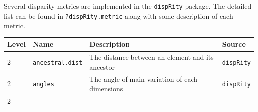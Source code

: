 \documentclass[]{book}
\begin{document}
Several disparity metrics are implemented in the \texttt{dispRity} package.
The detailed list can be found in \texttt{?dispRity.metric} along with some description of each metric.

\begin{longtable}[]{@{}llll@{}}
\toprule
\begin{minipage}[b]{0.07\columnwidth}\raggedright
Level\strut
\end{minipage} & \begin{minipage}[b]{0.07\columnwidth}\raggedright
Name\strut
\end{minipage} & \begin{minipage}[b]{0.64\columnwidth}\raggedright
Description\strut
\end{minipage} & \begin{minipage}[b]{0.10\columnwidth}\raggedright
Source\strut
\end{minipage}\tabularnewline
\midrule
\endhead
\begin{minipage}[t]{0.07\columnwidth}\raggedright
2\strut
\end{minipage} & \begin{minipage}[t]{0.07\columnwidth}\raggedright
\texttt{ancestral.dist}\strut
\end{minipage} & \begin{minipage}[t]{0.64\columnwidth}\raggedright
The distance between an element and its ancestor\strut
\end{minipage} & \begin{minipage}[t]{0.10\columnwidth}\raggedright
\texttt{dispRity}\strut
\end{minipage}\tabularnewline
\begin{minipage}[t]{0.07\columnwidth}\raggedright
2\strut
\end{minipage} & \begin{minipage}[t]{0.07\columnwidth}\raggedright
\texttt{angles}\strut
\end{minipage} & \begin{minipage}[t]{0.64\columnwidth}\raggedright
The angle of main variation of each dimensions\strut
\end{minipage} & \begin{minipage}[t]{0.10\columnwidth}\raggedright
\texttt{dispRity}\strut
\end{minipage}\tabularnewline
\begin{minipage}[t]{0.07\columnwidth}\raggedright
2\strut
\end{minipage} & \begin{minipage}[t]{0.07\columnwidth}\raggedright

\end{minipage}
\end{longtable}
\end{document}
